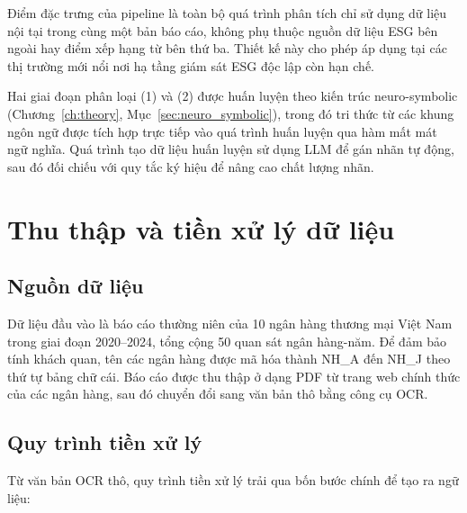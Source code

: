 

Điểm đặc trưng của pipeline là toàn bộ quá trình phân tích chỉ sử dụng dữ liệu nội tại trong cùng một bản báo cáo, không phụ thuộc nguồn dữ liệu ESG bên ngoài hay điểm xếp hạng từ bên thứ ba. Thiết kế này cho phép áp dụng tại các thị trường mới nổi nơi hạ tầng giám sát ESG độc lập còn hạn chế.

Hai giai đoạn phân loại (1) và (2) được huấn luyện theo kiến trúc neuro-symbolic (Chương~\ref{ch:theory}, Mục~\ref{sec:neuro_symbolic}), trong đó tri thức từ các khung ngôn ngữ được tích hợp trực tiếp vào quá trình huấn luyện qua hàm mất mát ngữ nghĩa. Quá trình tạo dữ liệu huấn luyện sử dụng LLM để gán nhãn tự động, sau đó đối chiếu với quy tắc ký hiệu để nâng cao chất lượng nhãn.

\section{Thu thập và tiền xử lý dữ liệu}
\label{sec:data_preparation}

\subsection{Nguồn dữ liệu}
\label{subsec:data_source}

Dữ liệu đầu vào là báo cáo thường niên của 10 ngân hàng thương mại Việt Nam trong giai đoạn 2020--2024, tổng cộng 50 quan sát ngân hàng-năm. Để đảm bảo tính khách quan, tên các ngân hàng được mã hóa thành NH\_A đến NH\_J theo thứ tự bảng chữ cái. Báo cáo được thu thập ở dạng PDF từ trang web chính thức của các ngân hàng, sau đó chuyển đổi sang văn bản thô bằng công cụ OCR.

\subsection{Quy trình tiền xử lý}
\label{subsec:preprocessing}

Từ văn bản OCR thô, quy trình tiền xử lý trải qua bốn bước chính để tạo ra ngữ liệu:

